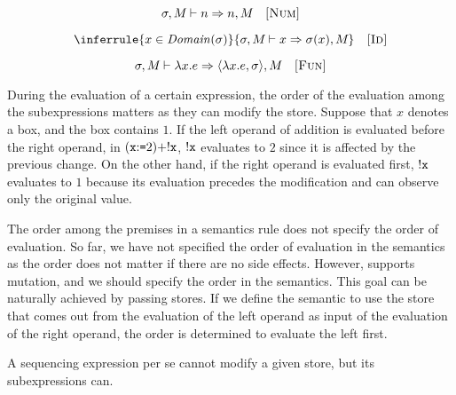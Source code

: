 
\vspace{-1em}

\[
  \sigma,M_{}\vdash n\Rightarrow n,M_{}
  \quad\textsc{[Num]}
\]

\vspace{-1em}


\vspace{-1em}

\[
  \inferrule
  { x\in\dom{\sigma} }
  { \sevald{}{x}{\sigma(x)}{} }
  \quad\textsc{[Id]}
\]

\vspace{-1em}


\vspace{-1em}

\[
  \sigma,M_{}\vdash\lambda x.e\Rightarrow\langle\lambda x.e,\sigma\rangle,M_{}
  \quad\textsc{[Fun]}
\]

During the evaluation of a certain expression,
the order of the evaluation among the subexpressions matters as they can modify the
store. Suppose that $x$ denotes a box, and the box contains $1$.
If the left operand of addition is evaluated before the right operand, in
$(\texttt{x}{:}\texttt{=}2)+!\texttt{x}$, $!\texttt{x}$ evaluates to $2$ since it is
affected by the previous change. On the other hand, if the
right operand is evaluated first, $!\texttt{x}$ evaluates to $1$ because
its evaluation precedes the modification and can observe only the original
value.

The order among the premises in a semantics rule does not specify the order of
evaluation. So far, we have not specified the order of evaluation in the
semantics as the order does not matter if there are no side
effects.
 However, \lang supports mutation, and we should specify
the order in the semantics. This goal can be naturally achieved by passing
stores. If we define the semantic to use the store that comes out from the
evaluation of the left operand as input of the evaluation of the right operand,
the order is determined to evaluate the left first.

A sequencing expression per se cannot modify a given store, but its subexpressions
can.

